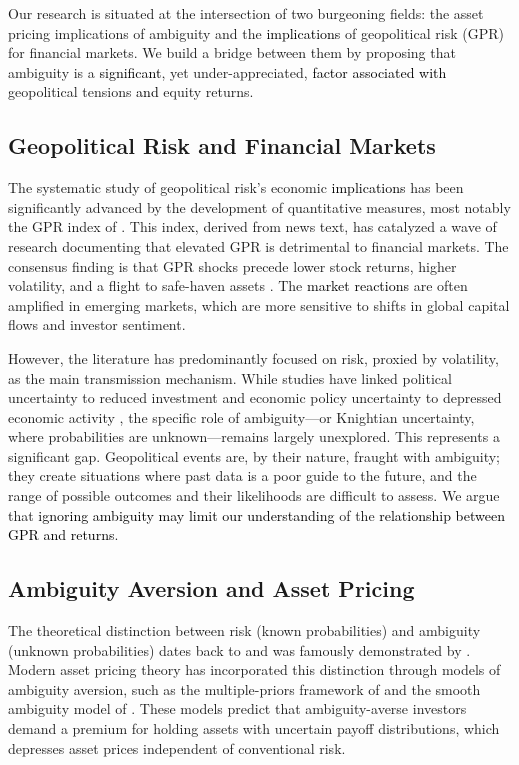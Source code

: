\documentclass[preprint,12pt,authoryear]{elsarticle}
\begin{document}
Our research is situated at the intersection of two burgeoning fields: the asset pricing implications of ambiguity and the \textcolor{black}{implications} of geopolitical risk (GPR) for financial markets. We build a bridge between them by proposing that ambiguity is a \textcolor{black}{significant}, yet under-appreciated, \textcolor{black}{factor associated with} geopolitical tensions \textcolor{black}{and} equity returns.

\subsection{Geopolitical Risk and Financial Markets}

The systematic study of geopolitical risk's economic \textcolor{black}{implications} has been significantly advanced by the development of quantitative measures, most notably the GPR index of \citet{Caldara2022}. This index, derived from news text, has catalyzed a wave of research documenting that elevated GPR is detrimental to financial markets. The consensus finding is that GPR shocks precede lower stock returns, higher volatility, and a flight to safe-haven assets \citep{Caldara2022}. The \textcolor{black}{market reactions} are often amplified in emerging markets, which are more sensitive to shifts in global capital flows and investor sentiment.

However, the literature has predominantly focused on risk, proxied by volatility, as the main transmission mechanism. While studies have linked political uncertainty to reduced investment \citep{Pastor2013} and economic policy uncertainty to depressed economic activity \citep{Baker2016}, the specific role of ambiguity—or Knightian uncertainty, where probabilities are unknown—remains largely unexplored. This represents a significant gap. Geopolitical events are, by their nature, fraught with ambiguity; they create situations where past data is a poor guide to the future, and the range of possible outcomes and their likelihoods are difficult to assess. We argue that \textcolor{black}{ignoring ambiguity may limit our understanding} of the \textcolor{black}{relationship between GPR and returns}.

\subsection{Ambiguity Aversion and Asset Pricing}

The theoretical distinction between risk (known probabilities) and ambiguity (unknown probabilities) dates back to \citet{Knight1921} and was famously demonstrated by \citet{Ellsberg1961}. Modern asset pricing theory has incorporated this distinction through models of ambiguity aversion, such as the multiple-priors framework of \citet{Gilboa1989} and the smooth ambiguity model of \citet{Klibanoff2005}. These models predict that ambiguity-averse investors demand a premium for holding assets with uncertain payoff distributions, which depresses asset prices independent of conventional risk.
\end{document}
